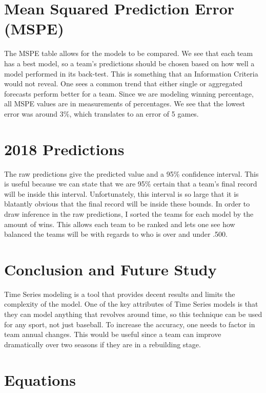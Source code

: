 \documentclass[12pt,a4paper,man,natbib]{apa6}
\begin{document}
\newpage

\section{Mean Squared Prediction Error (MSPE)}

The MSPE table allows for the models to be compared. We see 
that each team has a best model, so a team's predictions 
should be chosen based on how well a model performed in its 
back-test. This is something that an Information Criteria 
would not reveal. One sees a common trend that either single 
or aggregated forecasts perform better for a team. Since we 
are modeling winning percentage, all MSPE values are in 
measurements of percentages. We see that the lowest error 
was around 3\%, which translates to an error of 5 games.

\section{2018 Predictions}

The raw predictions give the predicted value and a 95\% 
confidence interval. This is useful because we can state 
that we are 95\% certain that a team's final record will be 
inside this interval. Unfortunately, this interval is so 
large that it is blatantly obvious that the final record 
will be inside these bounds. In order to draw inference in 
the raw predictions, I sorted the teams for each model by 
the amount of wins. This allows each team to be ranked and 
lets one see how balanced the teams will be with regards to 
who is over and under .500. 

\section{Conclusion and Future Study}

Time Series modeling is a tool that provides decent results 
and limits the complexity of the model. One of the key 
attributes of Time Series models is that they can model 
anything that revolves around time, so this technique can be 
used for any sport, not just baseball. To increase the 
accuracy, one needs to factor in team annual changes. This 
would be useful since a team can improve dramatically over 
two seasons if they are in a rebuilding stage.



\appendix



\section{Equations}


\end{document}
